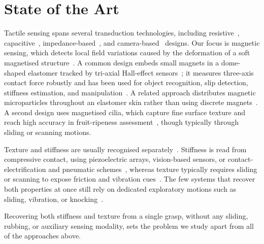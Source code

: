 \documentclass[journal]{IEEEtran}
\begin{document}
%
\section{State of the Art}
\label{sec:SOTA}
%
Tactile sensing spans several transduction technologies, including resistive~\cite{zhu2022recent}, capacitive~\cite{niu2025morphological}, impedance-based~\cite{cui2023recent}, and camera-based~\cite{li2025classification} designs. Our focus is magnetic sensing, which detects local field variations caused by the deformation of a soft magnetised structure~\cite{man2022recent}. A common design embeds small magnets in a dome-shaped elastomer tracked by tri-axial Hall-effect sensors~\cite{tomo2018uSkin}; it measures three-axis contact force robustly and has been used for object recognition, slip detection, stiffness estimation, and manipulation~\cite{kirby2022dynamExplore,funabashi24tacObjRec,zenha21slip,giudici2025haptStiffPercep,mao2024dexskills}. A related approach distributes magnetic microparticles throughout an elastomer skin rather than using discrete magnets~\cite{hellebrekers20reskin}. A second design uses magnetised cilia, which capture fine surface texture and reach high accuracy in fruit-ripeness assessment~\cite{ribeiro2017bioCiliaSensor,ribeiro2020tacFruitAssess}, though typically through sliding or scanning motions.
%

%
Texture and stiffness are usually recognised separately~\cite{luo2025tactile,jiang2022robotic,yu2025recent}. Stiffness is read from compressive contact, using piezoelectric arrays, vision-based sensors, or contact-electrification and pneumatic schemes~\cite{amin2023embedded,sharma2025mechanoreceptor,li2024assessing,li2025soft,al2025artificially}, whereas texture typically requires sliding or scanning to expose friction and vibration cues~\cite{zheng2025bionic,cao2024multimodal}. The few systems that recover both properties at once still rely on dedicated exploratory motions such as sliding, vibration, or knocking~\cite{guo2025multimodal,qiu2024quantitative}.
%

%
%
Recovering both stiffness and texture from a single grasp, without any sliding, rubbing, or auxiliary sensing modality, sets the problem we study apart from all of the approaches above.
%
\end{document}
